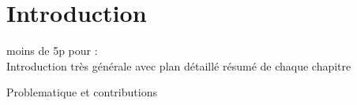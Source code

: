 \chapter*{Introduction}

moins de 5p pour : \\

Introduction très générale avec plan détaillé résumé de chaque chapitre


Problematique et contributions\\
